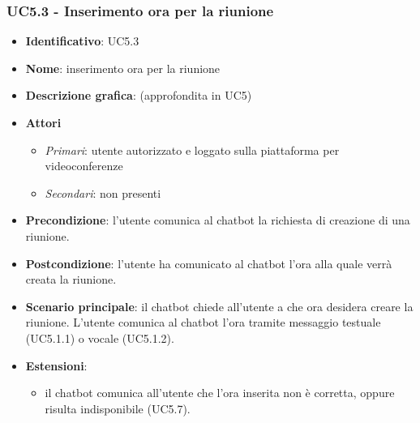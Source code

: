 \subsubsection{UC5.3 - Inserimento ora per la riunione}
\begin{itemize}
    \item \textbf{Identificativo}: UC5.3
    \item \textbf{Nome}: inserimento ora per la riunione
    \item \textbf{Descrizione grafica}: (approfondita in UC5)
    \item \textbf{Attori}
 \begin{itemize} 
    \item \textit{Primari}: utente autorizzato e loggato sulla piattaforma per videoconferenze
    \item \textit{Secondari}: non presenti
 \end{itemize}
 \item \textbf{Precondizione}: l'utente comunica al chatbot la richiesta di creazione di una riunione.
 \item \textbf{Postcondizione}: l'utente ha comunicato al chatbot l'ora alla quale verrà creata la riunione.
 \item \textbf{Scenario principale}: il chatbot chiede all'utente a che ora desidera creare la riunione. L'utente comunica al chatbot l'ora tramite messaggio testuale (UC5.1.1) o vocale (UC5.1.2).
 \item \textbf{Estensioni}: 
 \begin{itemize} 
    \item il chatbot comunica all'utente che l'ora inserita non è corretta, oppure risulta indisponibile (UC5.7).
 \end{itemize}
\end{itemize}

